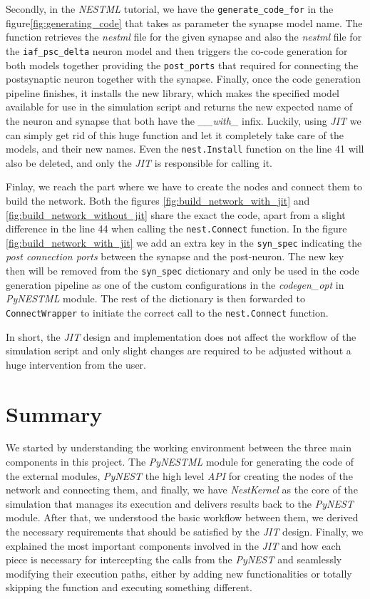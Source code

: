 Secondly, in the \emph{NESTML} tutorial, we have the \texttt{generate\_code\_for} in the figure\autoref{fig:generating_code} that takes as parameter the synapse model name. The function retrieves the \emph{nestml} file for the given synapse and also the \emph{nestml} file for the \texttt{iaf\_psc\_delta} neuron model and then triggers the co-code generation for both models together providing the \texttt{post\_ports} that required for connecting the postsynaptic neuron together with the synapse. Finally, once the code generation pipeline finishes, it installs the new library, which makes the specified model available for use in the simulation script and returns the new expected name of the neuron and synapse that both have the \emph{\_\_with\_} infix. Luckily, using \emph{JIT} we can simply get rid of this huge function and let it completely take care of the models, and their new names. Even the \texttt{nest.Install} function on the line 41 will also be deleted, and only the \emph{JIT} is responsible for calling it.



Finlay, we reach the part where we have to create the nodes and connect them to build the network. Both the figures \autoref{fig:build_network_with_jit} and \autoref{fig:build_network_without_jit} share the exact the code, apart from a slight difference in the line 44 when calling the \texttt{nest.Connect} function. In the figure \autoref{fig:build_network_with_jit} we add an extra key in the \texttt{syn\_spec} indicating the \emph{post connection ports} between the synapse and the post-neuron. The new key then will be removed from the \texttt{syn\_spec} dictionary and only be used in the code generation pipeline as one of the custom configurations in the \emph{codegen\_opt} in \emph{PyNESTML} module. The rest of the dictionary is then forwarded to \texttt{ConnectWrapper} to initiate the correct call to the \texttt{nest.Connect} function.

In short, the \emph{JIT} design and implementation does not affect the workflow of the simulation script and only slight changes are required to be adjusted without a huge intervention from the user.

\section{Summary}

We started by understanding the working environment between the three main components in this project. The \emph{PyNESTML} module for generating the code of the external modules, \emph{PyNEST} the high level \emph{API} for creating the nodes of the network and connecting them, and finally, we  have \emph{NestKernel} as the core of the simulation that manages its execution and delivers results back to the \emph{PyNEST} module. After that, we understood the basic workflow between them, we derived the necessary requirements that should be satisfied by the \emph{JIT} design. Finally, we explained the most important components involved in the \emph{JIT} and how each piece is necessary for intercepting the calls from the \emph{PyNEST} and seamlessly modifying their execution paths, either by adding new functionalities or totally skipping the function and executing something different.


